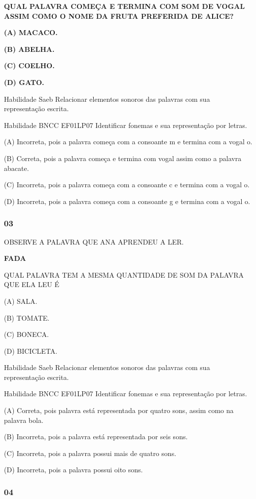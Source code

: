 \begin{escola}
\textbf{QUAL PALAVRA COMEÇA E TERMINA COM SOM DE VOGAL ASSIM COMO O NOME
DA FRUTA PREFERIDA DE ALICE?}

\textbf{(A) MACACO.}

\textbf{(B) ABELHA.}

\textbf{(C) COELHO.}

\textbf{(D) GATO.}

Habilidade Saeb Relacionar elementos sonoros das palavras com sua
representação escrita.

Habilidade BNCC EF01LP07 Identificar fonemas e sua representação por
letras.

(A) Incorreta, pois a palavra começa com a consoante m e termina com a
vogal o.

(B) Correta, pois a palavra começa e termina com vogal assim como a
palavra abacate.

(C) Incorreta, pois a palavra começa com a consoante c e termina com a
vogal o.

(D) Incorreta, pois a palavra começa com a consoante g e termina com a
vogal o.

\subsubsection{03}\label{section-43}

OBSERVE A PALAVRA QUE ANA APRENDEU A LER.

\textbf{FADA}

QUAL PALAVRA TEM A MESMA QUANTIDADE DE SOM DA PALAVRA QUE ELA LEU É

(A) SALA.

(B) TOMATE.

(C) BONECA.

(D) BICICLETA.

Habilidade Saeb Relacionar elementos sonoros das palavras com sua
representação escrita.

Habilidade BNCC EF01LP07 Identificar fonemas e sua representação por
letras.

(A) Correta, pois palavra está representada por quatro sons, assim como
na palavra bola.

(B) Incorreta, pois a palavra está representada por seis sons.

(C) Incorreta, pois a palavra possui mais de quatro sons.

(D) Incorreta, pois a palavra possui oito sons.

\subsubsection{04}\label{section-44}


\end{escola}
